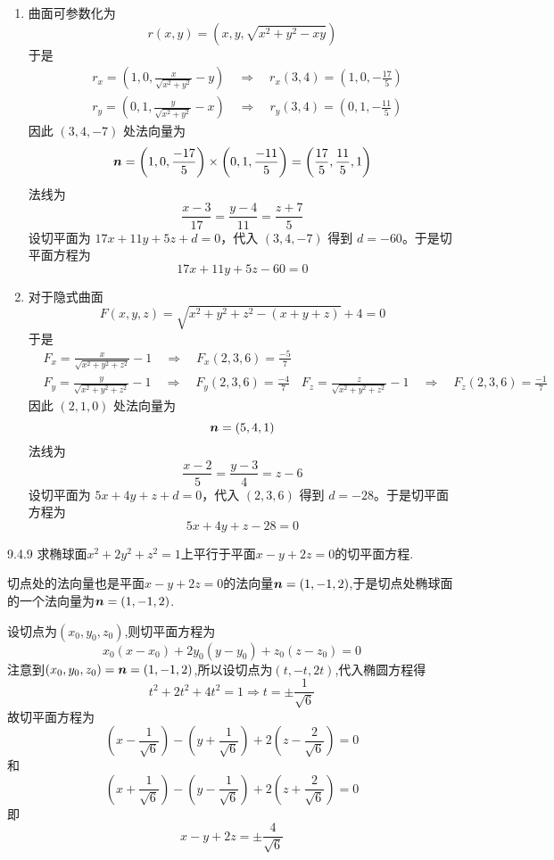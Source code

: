 \begin{solution}
    \begin{enumerate}
        \item 曲面可参数化为
        \[
        r(x, y) = \left( x, y, \sqrt{x^2 + y^2 - xy} \right)
        \]
        于是\begin{align*}
            &r_x = \left( 1, 0, \frac{x}{\sqrt{x^2 + y^2}} - y \right) \quad \Rightarrow \quad r_x(3, 4) = \left( 1, 0, -\frac{17}{5} \right)\\
            &r_y = \left( 0, 1, \frac{y}{\sqrt{x^2 + y^2}} - x \right) \quad \Rightarrow \quad r_y(3, 4) = \left( 0, 1, -\frac{11}{5} \right)
        \end{align*}
        因此 $(3, 4, -7)$ 处法向量为
\[
\bm{n} = \left( 1, 0, \frac{-17}{5} \right) \times \left( 0, 1, \frac{-11}{5} \right) = \left( \frac{17}{5}, \frac{11}{5}, 1 \right)
\]
法线为
\[
\frac{x - 3}{17} = \frac{y - 4}{11} = \frac{z + 7}{5}
\]
设切平面为 $17x + 11y + 5z + d = 0$，代入 $(3, 4, -7)$ 得到 $d = -60$。于是切平面方程为
\[
17x + 11y + 5z - 60 = 0
\]
\item 
对于隐式曲面
\[
F(x, y, z) = \sqrt{x^2 + y^2 + z^2 - (x + y + z)} + 4 = 0
\]
于是\begin{align*}
   & F_x = \frac{x}{\sqrt{x^2 + y^2 + z^2}} - 1 \quad \Rightarrow \quad F_x(2, 3, 6) = \frac{-5}{7}\\
    &F_y = \frac{y}{\sqrt{x^2 + y^2 + z^2}} - 1 \quad \Rightarrow \quad F_y(2, 3, 6) = \frac{-4}{7}
    &F_z = \frac{z}{\sqrt{x^2 + y^2 + z^2}} - 1 \quad \Rightarrow \quad F_z(2, 3, 6) = \frac{-1}{7}
\end{align*}
因此 $(2, 1, 0)$ 处法向量为
\[
\bm{n} = (5, 4, 1)
\]法线为
\[
\frac{x - 2}{5} = \frac{y - 3}{4} = z - 6
\]设切平面为 $5x + 4y + z + d = 0$，代入 $(2, 3, 6)$ 得到 $d = -28$。于是切平面方程为
\[
5x + 4y + z - 28 = 0
\]

    \end{enumerate}
\end{solution}

\begin{exercise}{9.4.9}
求椭球面$x^2+2y^2+z^2=1$上平行于平面$x-y+2z=0$的切平面方程.
\end{exercise}

\begin{solution}
    切点处的法向量也是平面$x-y+2z=0$的法向量$\bm{n} = (1, -1, 2)$,于是切点处椭球面的一个法向量为$\bm{n} = (1, -1, 2)$.

    设切点为$(x_0, y_0, z_0)$,则切平面方程为
    $$x_0(x-x_0) + 2y_0(y-y_0) + z_0(z-z_0) = 0$$
    注意到$(x_0, y_0, z_0) = \bm{n} = (1, -1, 2)$,所以设切点为$(t,-t,2t)$,代入椭圆方程得
    $$t^2 + 2 t^2 + 4t^2 = 1 \Rightarrow t = \pm \frac{1}{\sqrt 6}$$
    故切平面方程为
    $$(x-\frac{1}{\sqrt 6}) - (y+\frac{1}{\sqrt 6}) + 2(z-\frac{2}{\sqrt 6}) = 0$$
    和
    $$(x+\frac{1}{\sqrt 6}) - (y-\frac{1}{\sqrt 6}) + 2(z+\frac{2}{\sqrt 6}) = 0$$
    即$$x-y+2z = \pm \frac{4}{\sqrt 6}$$
\end{solution}

